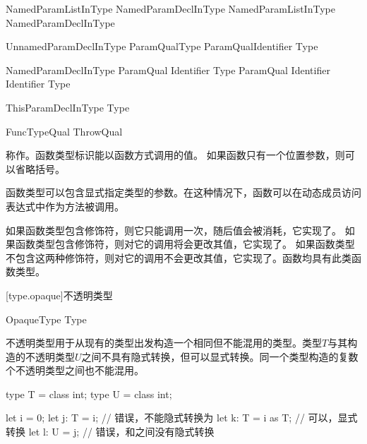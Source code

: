 \begin{bnf}{NamedParamListInType}
    NamedParamDeclInType \br
    NamedParamListInType \terminal{,} NamedParamDeclInType
\end{bnf}

\begin{bnf}{UnnamedParamDeclInType}
    ParamQual\bnfq Type \br
    ParamQual\bnfq Identifier \terminal{:} Type\bnfq
\end{bnf}

\begin{bnf}{NamedParamDeclInType}
    ParamQual\bnfq \terminal{(} Identifier \terminal{)} Type\bnfq \br
    ParamQual\bnfq \terminal{(} Identifier \terminal{)} Identifier \terminal{:} Type\bnfq
\end{bnf}

\begin{bnf}{ThisParamDeclInType}
     \terminal{:} Type
\end{bnf}

\begin{bnf}{FuncTypeQual}
    ThrowQual \br
     \br
     \br
     \br
\end{bnf}

\pnum
{}称作。函数类型标识能以函数方式调用的值。
如果函数只有一个位置参数，则可以省略括号。

\pnum
函数类型可以包含显式指定类型的参数。在这种情况下，函数可以在动态成员访问表达式中作为方法被调用。

\pnum
如果函数类型包含修饰符，则它只能调用一次，随后值会被消耗，它实现了。
如果函数类型包含修饰符，则对它的调用将会更改其值，它实现了。
如果函数类型不包含这两种修饰符，则对它的调用不会更改其值，它实现了。函数均具有此类函数类型。

[type.opaque]{不透明类型}

\begin{bnf}{OpaqueType}
     Type
\end{bnf}

\pnum
不透明类型用于从现有的类型出发构造一个相同但不能混用的类型。类型$T$与其构造的不透明类型$U$之间不具有隐式转换，但可以显式转换。同一个类型构造的复数个不透明类型之间也不能混用。

\enterexample
\begin{codeblock}

type T = class int;
type U = class int;

let i = 0;
let j: T = i; // 错误，不能隐式转换为
let k: T = i as T; // 可以，显式转换
let l: U = j; // 错误，和之间没有隐式转换

\end{codeblock}
\exitexample

